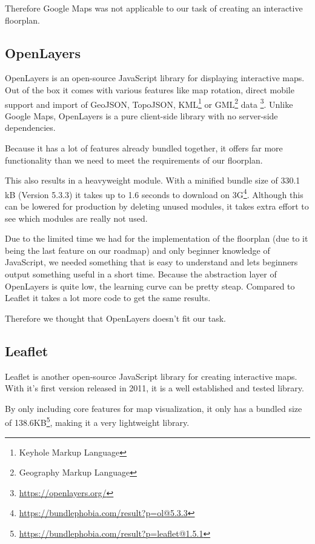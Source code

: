 Therefore Google Maps was not applicable to our task of creating an interactive floorplan.

\subsection{OpenLayers}
\label{OpenLayers}

OpenLayers is an open-source JavaScript library for displaying interactive maps. Out of the box it comes with various features like map rotation, direct mobile support and import of GeoJSON, TopoJSON, KML\footnote{Keyhole Markup Language} or GML\footnote{Geography Markup Language} data \footnote{\url{https://openlayers.org/}}. Unlike Google Maps, OpenLayers is a pure client-side library with no server-side dependencies. 

Because it has a lot of features already bundled together, it offers far more functionality than we need to meet the requirements of our floorplan. 

This also results in a heavyweight module. With a minified bundle size of 330.1 kB (Version 5.3.3) it takes up to 1.6 seconds to download on 3G\footnote{\url{https://bundlephobia.com/result?p=ol@5.3.3}}. Although this can be lowered for production by deleting unused modules, it takes extra effort to see which modules are really not used.

Due to the limited time we had for the implementation of the floorplan (due to it being the last feature on our roadmap) and only beginner knowledge of JavaScript, we needed something that is easy to understand and lets beginners output something useful in a short time. Because the abstraction layer of OpenLayers  is quite low, the learning curve can be pretty steap. Compared to Leaflet it takes a lot more code to get the same results.

Therefore we thought that OpenLayers doesn't fit our task.

\subsection{Leaflet}
\label{Leaflet}

Leaflet is another open-source JavaScript library for creating interactive maps. With it's first version released in 2011, it is a well established and tested library. 

By only including core features for map visualization, it only has a bundled size of 138.6KB\footnote{\url{https://bundlephobia.com/result?p=leaflet@1.5.1}}, making it a very lightweight library.

